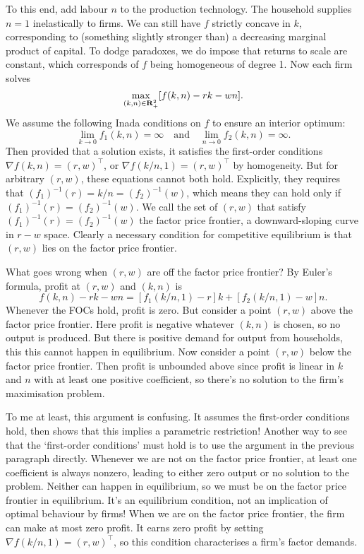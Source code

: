 \documentclass[11pt,letterpaper,reqno,oneside]{article}
\begin{document}
To this end, add labour $n$ to the production technology. The household supplies $n=1$ inelastically to firms. We can still have $f$ strictly concave in $k$, corresponding to (something slightly stronger than) a decreasing marginal product of capital. To dodge paradoxes, we do impose that returns to scale are constant, which corresponds of $f$ being homogeneous of degree 1. Now each firm solves
%
\begin{equation*}
	\max_{(k,n) \in \mathbf{R}_+^2} [ f(k,n) - rk - wn ] .
\end{equation*}
%
We assume the following Inada conditions on $f$ to ensure an interior optimum:
%
\begin{equation*}
	\lim_{k\to 0} f_1(k,n) = \infty
	\quad\text{and}\quad
	\lim_{n\to 0} f_2(k,n) = \infty .
\end{equation*}
%
Then provided that a solution exists, it satisfies the first-order conditions $\nabla f(k,n) = (r,w)^\top$, or $\nabla f(k/n,1) = (r,w)^\top$ by homogeneity. But for arbitrary $(r,w)$, these equations cannot both hold. Explicitly, they requires that $(f_1)^{-1}(r) = k/n = (f_2)^{-1}(w)$, which means they can hold only if $(f_1)^{-1}(r) = (f_2)^{-1}(w)$. We call the set of $(r,w)$ that satisfy $(f_1)^{-1}(r) = (f_2)^{-1}(w)$ the factor price frontier, a downward-sloping curve in $r-w$ space. Clearly a necessary condition for competitive equilibrium is that $(r,w)$ lies on the factor price frontier.

What goes wrong when $(r,w)$ are off the factor price frontier? By Euler's formula, profit at $(r,w)$ and $(k,n)$ is
%
\begin{equation*}
	f(k,n) - rk - wn = [ f_1(k/n,1) - r ] k + [ f_2(k/n,1) - w ] n .
\end{equation*}
%
Whenever the FOCs hold, profit is zero. But consider a point $(r,w)$ above the factor price frontier. Here profit is negative whatever $(k,n)$ is chosen, so no output is produced. But there is positive demand for output from households, this this cannot happen in equilibrium. Now consider a point $(r,w)$ below the factor price frontier. Then profit is unbounded above since profit is linear in $k$ and $n$ with at least one positive coefficient, so there's no solution to the firm's maximisation problem.

To me at least, this argument is confusing. It assumes the first-order conditions hold, then shows that this implies a parametric restriction! Another way to see that the `first-order conditions' must hold is to use the argument in the previous paragraph directly. Whenever we are not on the factor price frontier, at least one coefficient is always nonzero, leading to either zero output or no solution to the problem. Neither can happen in equilibrium, so we must be on the factor price frontier in equilibrium. It's an equilibrium condition, not an implication of optimal behaviour by firms! When we are on the factor price frontier, the firm can make at most zero profit. It earns zero profit by setting $\nabla f(k/n,1) = (r,w)^\top$, so this condition characterises a firm's factor demands.
\end{document}
